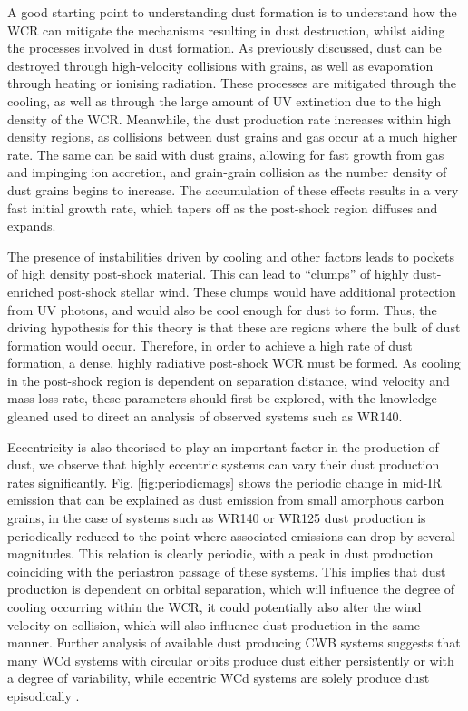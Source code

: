 A good starting point to understanding dust formation is to understand how the WCR can mitigate the mechanisms resulting in dust destruction, whilst aiding the processes involved in dust formation.
As previously discussed, dust can be destroyed through high-velocity collisions with grains, as well as evaporation through heating or ionising radiation.
These processes are mitigated through the cooling, as well as through the large amount of UV extinction due to the high density of the WCR.
Meanwhile, the dust production rate increases within high density regions, as collisions between dust grains and gas occur at a much higher rate.
The same can be said with dust grains, allowing for fast growth from gas and impinging ion accretion, and grain-grain collision as the number density of dust grains begins to increase.
The accumulation of these effects results in a very fast initial growth rate, which tapers off as the post-shock region diffuses and expands.

The presence of instabilities driven by cooling and other factors leads to pockets of high density post-shock material.
This can lead to ``clumps'' of highly dust-enriched post-shock stellar wind.
These clumps would have additional protection from UV photons, and would also be cool enough for dust to form.
Thus, the driving hypothesis for this theory is that these are regions where the bulk of dust formation would occur.
Therefore, in order to achieve a high rate of dust formation, a dense, highly radiative post-shock WCR must be formed.
As cooling in the post-shock region is dependent on separation distance, wind velocity and mass loss rate, these parameters should first be explored, with the knowledge gleaned used to direct an analysis of observed systems such as WR140.

Eccentricity is also theorised to play an important factor in the production of dust, we observe that highly eccentric systems can vary their dust production rates significantly.
Fig. \ref{fig:periodicmags} shows the periodic change in mid-IR emission that can be explained as dust emission from small amorphous carbon grains, in the case of systems such as WR140 or WR125 dust production is periodically reduced to the point where associated emissions can drop by several magnitudes.
This relation is clearly periodic, with a peak in dust production coinciding with the periastron passage of these systems.
This implies that dust production is dependent on orbital separation, which will influence the degree of cooling occurring within the WCR, it could potentially also alter the wind velocity on collision, which will also influence dust production in the same manner.
Further analysis of available dust producing CWB systems suggests that many WCd systems with circular orbits produce dust either persistently or with a degree of variability, while eccentric WCd systems are solely produce dust episodically \parencite{crowther_dust_2003,williamsVariableDustEmission2019}.

